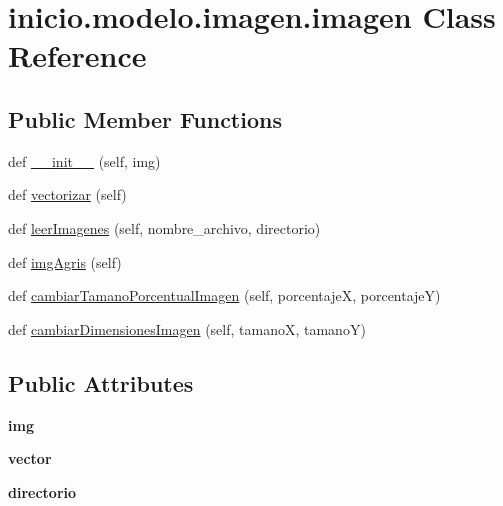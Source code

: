 \hypertarget{classinicio_1_1modelo_1_1imagen_1_1imagen}{}\section{inicio.\+modelo.\+imagen.\+imagen Class Reference}
\label{classinicio_1_1modelo_1_1imagen_1_1imagen}
\subsection*{Public Member Functions}
\begin{DoxyCompactItemize}
\item 
def \hyperlink{classinicio_1_1modelo_1_1imagen_1_1imagen_a2ba53c2f7cb5f3cb1cc942b9929c0caf}{\+\_\+\+\_\+init\+\_\+\+\_\+} (self, img)
\item 
def \hyperlink{classinicio_1_1modelo_1_1imagen_1_1imagen_a2cc040551f968a5c0f3a511ceda73804}{vectorizar} (self)
\item 
def \hyperlink{classinicio_1_1modelo_1_1imagen_1_1imagen_a26354b229b4443a5ff61891bc5a617fa}{leer\+Imagenes} (self, nombre\+\_\+archivo, directorio)
\item 
def \hyperlink{classinicio_1_1modelo_1_1imagen_1_1imagen_ab3913b41763b116d6d452d27dbe93d1f}{img\+Agris} (self)
\item 
def \hyperlink{classinicio_1_1modelo_1_1imagen_1_1imagen_a07f410a7549699fdc65be4f8f822f79a}{cambiar\+Tamano\+Porcentual\+Imagen} (self, porcentajeX, porcentajeY)
\item 
def \hyperlink{classinicio_1_1modelo_1_1imagen_1_1imagen_a8e7da80b8ae76219a82e8f4424d769a0}{cambiar\+Dimensiones\+Imagen} (self, tamanoX, tamanoY)
\end{DoxyCompactItemize}
\subsection*{Public Attributes}
\begin{DoxyCompactItemize}
\item 
\mbox{\label{classinicio_1_1modelo_1_1imagen_1_1imagen_a8d8a94067b4073cfdf1f98adfbed61e9}} 
{\bfseries img}
\item 
\mbox{\label{classinicio_1_1modelo_1_1imagen_1_1imagen_a2597e66d7e53d68aeabfc7bb73d6953d}} 
{\bfseries vector}
\item 
\mbox{\label{classinicio_1_1modelo_1_1imagen_1_1imagen_ae3dbb7d2d68bd276c848480778d89a55}} 
{\bfseries directorio}
\end{DoxyCompactItemize}



